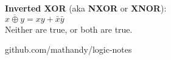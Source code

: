 \documentclass{article}
\begin{document}
\noindent \textbf{Inverted XOR} (aka \textbf{NXOR} or \textbf{XNOR}):\\
$\overline{x \oplus y} = xy + \bar{x}\bar{y}$\\
{\large Neither are true, or both are true.}


\hfill {\color{gray}\normalsize github.com/mathandy/logic-notes}
\end{document}
